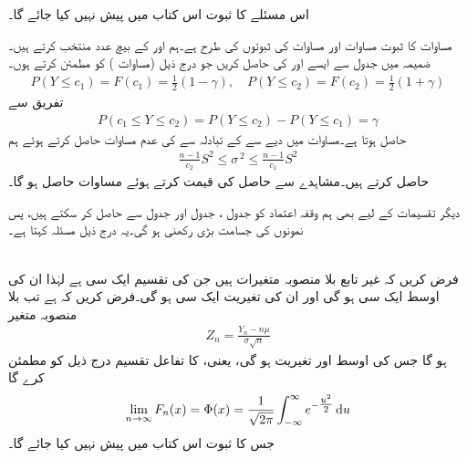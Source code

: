 اس مسئلے کا ثبوت اس کتاب میں پیش نہیں کیا جائے گا۔

مساوات  کا ثبوت مساوات  اور مساوات  کی ثبوتوں کی طرح ہے۔ہم  اور  کے بیچ عدد  منتخب کرتے ہیں۔ضمیمہ  میں جدول  سے ایسے   اور  کی حاصل کریں جو درج ذیل (مساوات ) کو مطمئن کرتے ہوں۔
\begin{align*}
P(Y\le c_1)=F(c_1)=\frac{1}{2}(1-\gamma),\quad P(Y\le c_2)=F(c_2)=\frac{1}{2}(1+\gamma)
\end{align*}
تفریق سے
\begin{align*}
P(c_1\le Y\le c_2)=P(Y\le c_2)-P(Y\le c_1)=\gamma
\end{align*}
حاصل ہوتا ہے۔مساوات  میں دیے  سے  کے تبادلہ سے  کی عدم مساوات حاصل کرتے ہوئے ہم 
\begin{align*}
\frac{n-1}{c_2}S^2\le \sigma^{\,2} \le \frac{n-1}{c_1}S^2
\end{align*} 
حاصل کرتے ہیں۔مشاہدے سے حاصل  کی قیمت  کرتے ہوئے  مساوات  حاصل ہو گا۔

دیگر تقسیمات کے لیے بھی ہم وقفہ اعتماد کو جدول ، جدول  اور جدول  سے حاصل کر سکتے ہیں، پس نمونوں کی جسامت بڑی رکھنی ہو گی۔یہ درج ذیل مسئلہ کہتا ہے۔

\quad {}\\
فرض کریں کہ  غیر تابع بلا منصوبہ متغیرات ہیں جن کی تقسیم ایک سی ہے لہٰذا ان کی اوسط  ایک سی ہو گی اور ان کی تغیریت   ایک سی  ہو گی۔فرض کریں کہ  ہے تب بلا منصوبہ متغیر
\begin{align}
Z_n=\frac{Y_n-n\mu}{\sigma \sqrt{n}}
\end{align}
 ہو گا جس کی اوسط  اور تغیریت  ہو گی، یعنی،  کا تفاعل تقسیم  درج ذیل کو مطمئن کرے گا
\begin{align*}
\lim_{n\to \infty} F_n(x)=\Phi(x)=\frac{1}{\sqrt{2\pi}}\int_{-\infty}^{\infty} e^{-\tfrac{u^2}{2}}\dif u
\end{align*}
جس کا ثبوت اس کتاب میں پیش نہیں کیا جائے گا۔

